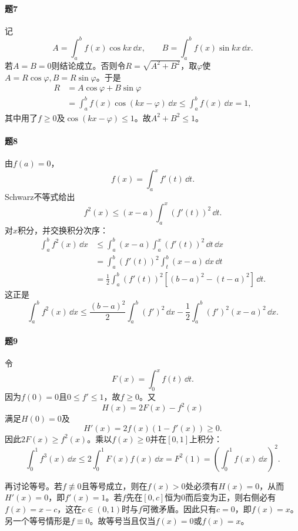 \paragraph{题7}
\begin{xsolution}
记
\[
 A=\int_a^bf(x)\cos kx\,\dd x,\qquad
 B=\int_a^bf(x)\sin kx\,\dd x.
\]
若$A=B=0$则结论成立。否则令$R=\sqrt{A^2+B^2}$，取$\varphi$使$A=R\cos\varphi,B=R\sin\varphi$。于是
\begin{align*}
R&=A\cos\varphi+B\sin\varphi\\
&=\int_a^bf(x)\cos(kx-\varphi)\,\dd x
\le\int_a^bf(x)\,\dd x=1,
\end{align*}
其中用了$f\ge0$及$\cos(kx-\varphi)\le1$。故$A^2+B^2\le1$。
\end{xsolution}

\paragraph{题8}
\begin{xsolution}
由$f(a)=0$，
\[
 f(x)=\int_a^xf'(t)\,\dd t.
\]
Schwarz不等式给出
\[
 f^2(x)\le(x-a)\int_a^x(f'(t))^2\,\dd t.
\]
对$x$积分，并交换积分次序：
\begin{align*}
\int_a^bf^2(x)\,\dd x
&\le\int_a^b(x-a)\int_a^x(f'(t))^2\,\dd t\,\dd x\\
&=\int_a^b(f'(t))^2\int_t^b(x-a)\,\dd x\,\dd t\\
&=\frac12\int_a^b(f'(t))^2\left[(b-a)^2-(t-a)^2\right]\,\dd t.
\end{align*}
这正是
\[
 \int_a^bf^2(x)\,\dd x
 \le\frac{(b-a)^2}{2}\int_a^b(f')^2\,\dd x
 -\frac12\int_a^b(f')^2(x-a)^2\,\dd x.
\]
\end{xsolution}

\paragraph{题9}
\begin{xsolution}
令
\[
 F(x)=\int_0^xf(t)\,\dd t.
\]
因为$f(0)=0$且$0\le f'\le1$，故$f\ge0$。又
\[
 H(x)=2F(x)-f^2(x)
\]
满足$H(0)=0$及
\[
 H'(x)=2f(x)(1-f'(x))\ge0.
\]
因此$2F(x)\ge f^2(x)$。乘以$f(x)\ge0$并在$[0,1]$上积分：
\[
 \int_0^1f^3(x)\,\dd x
 \le2\int_0^1F(x)f(x)\,\dd x
 =F^2(1)
 =\left(\int_0^1f(x)\,\dd x\right)^2.
\]

再讨论等号。若$f\not\equiv0$且等号成立，则在$f(x)>0$处必须有$H(x)=0$，从而$H'(x)=0$，即$f'(x)=1$。若$f$先在$[0,c]$恒为0而后变为正，则右侧必有$f(x)=x-c$，这在$c\in(0,1)$时与$f$可微矛盾。因此只有$c=0$，即$f(x)=x$。另一个等号情形是$f\equiv0$。故等号当且仅当$f(x)=0$或$f(x)=x$。
\end{xsolution}

